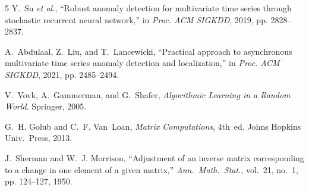 \documentclass[conference]{IEEEtran}
\begin{document}
\begin{thebibliography}{5}
Y.~Su \emph{et al.}, ``Robust anomaly detection for multivariate time series through stochastic recurrent neural network,'' in \emph{Proc. ACM SIGKDD}, 2019, pp. 2828--2837.

A.~Abdulaal, Z.~Liu, and T.~Lancewicki, ``Practical approach to asynchronous multivariate time series anomaly detection and localization,'' in \emph{Proc. ACM SIGKDD}, 2021, pp. 2485--2494.

V.~Vovk, A.~Gammerman, and G.~Shafer, \emph{Algorithmic Learning in a Random World}. Springer, 2005.

G.~H. Golub and C.~F. Van~Loan, \emph{Matrix Computations}, 4th~ed. Johns Hopkins Univ.\ Press, 2013.

J.~Sherman and W.~J. Morrison, ``Adjustment of an inverse matrix corresponding to a change in one element of a given matrix,'' \emph{Ann.\ Math.\ Stat.}, vol.~21, no.~1, pp. 124--127, 1950.
\end{thebibliography}
\end{document}
